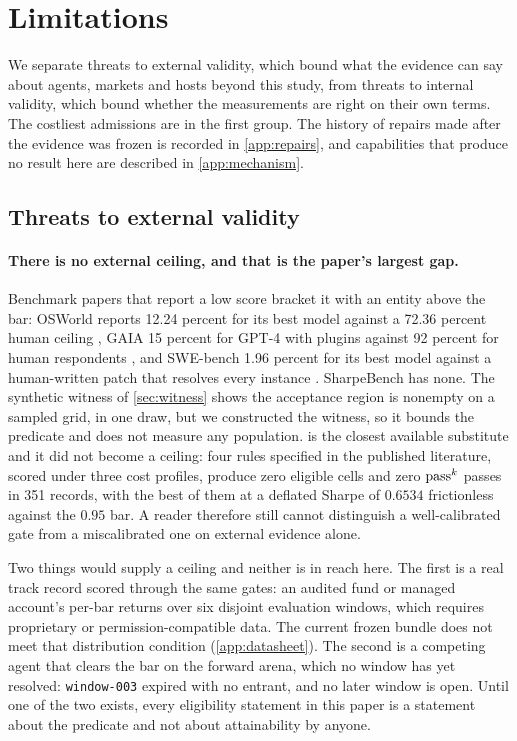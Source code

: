 \section{Limitations}\label{sec:limitations}

We separate threats to external validity, which bound what the evidence can say about agents, markets and hosts beyond this study, from threats to internal validity, which bound whether the measurements are right on their own terms. The costliest admissions are in the first group. The history of repairs made after the evidence was frozen is recorded in \cref{app:repairs}, and capabilities that produce no result here are described in \cref{app:mechanism}.

\subsection{Threats to external validity}\label{sec:threats-external}

\paragraph{There is no external ceiling, and that is the paper's largest gap.} Benchmark papers that report a low score bracket it with an entity above the bar: OSWorld reports 12.24 percent for its best model against a 72.36 percent human ceiling \citep{osworld2024}, GAIA 15 percent for GPT-4 with plugins against 92 percent for human respondents \citep{gaia2024}, and SWE-bench 1.96 percent for its best model against a human-written patch that resolves every instance \citep{swebench2024}. SharpeBench has none. The synthetic witness of \cref{sec:witness} shows the acceptance region is nonempty on a sampled grid, in one draw, but we constructed the witness, so it bounds the predicate and does not measure any population.  is the closest available substitute and it did not become a ceiling: four rules specified in the published literature, scored under three cost profiles, produce zero eligible cells and zero $\text{pass}^{k}$ passes in 351 records, with the best of them at a deflated Sharpe of $0.6534$ frictionless against the $0.95$ bar. A reader therefore still cannot distinguish a well-calibrated gate from a miscalibrated one on external evidence alone.

Two things would supply a ceiling and neither is in reach here. The first is a real track record scored through the same gates: an audited fund or managed account's per-bar returns over six disjoint evaluation windows, which requires proprietary or permission-compatible data. The current frozen bundle does not meet that distribution condition (\cref{app:datasheet}). The second is a competing agent that clears the bar on the forward arena, which no window has yet resolved: \texttt{window-003} expired with no entrant, and no later window is open. Until one of the two exists, every eligibility statement in this paper is a statement about the predicate and not about attainability by anyone.

